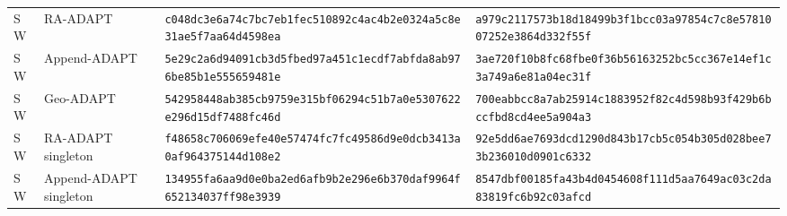 \documentclass[10pt,letterpaper]{article}
\begin{document}
\begin{longtable}{@{}llp{2.55in}p{2.55in}@{}}
SW & RA-ADAPT & \texttt{c048dc3e}\allowbreak{}\texttt{6a74c7bc}\allowbreak{}\texttt{7eb1fec5}\allowbreak{}\texttt{10892c4a}\allowbreak{}\texttt{c4b2e032}\allowbreak{}\texttt{4a5c8e31}\allowbreak{}\texttt{ae5f7aa6}\allowbreak{}\texttt{4d4598ea}\allowbreak{} & \texttt{a979c211}\allowbreak{}\texttt{7573b18d}\allowbreak{}\texttt{18499b3f}\allowbreak{}\texttt{1bcc03a9}\allowbreak{}\texttt{7854c7c8}\allowbreak{}\texttt{e5781007}\allowbreak{}\texttt{252e3864}\allowbreak{}\texttt{d332f55f}\allowbreak{} \\
SW & Append-ADAPT & \texttt{5e29c2a6}\allowbreak{}\texttt{d94091cb}\allowbreak{}\texttt{3d5fbed9}\allowbreak{}\texttt{7a451c1e}\allowbreak{}\texttt{cdf7abfd}\allowbreak{}\texttt{a8ab976b}\allowbreak{}\texttt{e85b1e55}\allowbreak{}\texttt{5659481e}\allowbreak{} & \texttt{3ae720f1}\allowbreak{}\texttt{0b8fc68f}\allowbreak{}\texttt{be0f36b5}\allowbreak{}\texttt{6163252b}\allowbreak{}\texttt{c5cc367e}\allowbreak{}\texttt{14ef1c3a}\allowbreak{}\texttt{749a6e81}\allowbreak{}\texttt{a04ec31f}\allowbreak{} \\
SW & Geo-ADAPT & \texttt{54295844}\allowbreak{}\texttt{8ab385cb}\allowbreak{}\texttt{9759e315}\allowbreak{}\texttt{bf06294c}\allowbreak{}\texttt{51b7a0e5}\allowbreak{}\texttt{307622e2}\allowbreak{}\texttt{96d15df7}\allowbreak{}\texttt{488fc46d}\allowbreak{} & \texttt{700eabbc}\allowbreak{}\texttt{c8a7ab25}\allowbreak{}\texttt{914c1883}\allowbreak{}\texttt{952f82c4}\allowbreak{}\texttt{d598b93f}\allowbreak{}\texttt{429b6bcc}\allowbreak{}\texttt{fbd8cd4e}\allowbreak{}\texttt{e5a904a3}\allowbreak{} \\
SW & RA-ADAPT singleton & \texttt{f48658c7}\allowbreak{}\texttt{06069efe}\allowbreak{}\texttt{40e57474}\allowbreak{}\texttt{fc7fc495}\allowbreak{}\texttt{86d9e0dc}\allowbreak{}\texttt{b3413a0a}\allowbreak{}\texttt{f9643751}\allowbreak{}\texttt{44d108e2}\allowbreak{} & \texttt{92e5dd6a}\allowbreak{}\texttt{e7693dcd}\allowbreak{}\texttt{1290d843}\allowbreak{}\texttt{b17cb5c0}\allowbreak{}\texttt{54b305d0}\allowbreak{}\texttt{28bee73b}\allowbreak{}\texttt{236010d0}\allowbreak{}\texttt{901c6332}\allowbreak{} \\
SW & Append-ADAPT singleton & \texttt{134955fa}\allowbreak{}\texttt{6aa9d0e0}\allowbreak{}\texttt{ba2ed6af}\allowbreak{}\texttt{b9b2e296}\allowbreak{}\texttt{e6b370da}\allowbreak{}\texttt{f9964f65}\allowbreak{}\texttt{2134037f}\allowbreak{}\texttt{f98e3939}\allowbreak{} & \texttt{8547dbf0}\allowbreak{}\texttt{0185fa43}\allowbreak{}\texttt{b4d04546}\allowbreak{}\texttt{08f111d5}\allowbreak{}\texttt{aa7649ac}\allowbreak{}\texttt{03c2da83}\allowbreak{}\texttt{819fc6b9}\allowbreak{}\texttt{2c03afcd}\allowbreak{} \\

\end{longtable}
\end{document}
